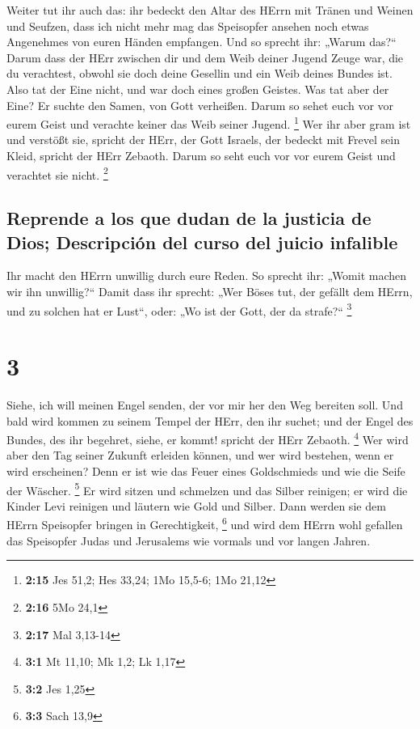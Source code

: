  Weiter tut ihr auch das: ihr bedeckt den Altar des HErrn
mit Tränen und Weinen und Seufzen, dass ich nicht mehr mag das
Speisopfer ansehen noch etwas Angenehmes von euren Händen empfangen.
 Und so sprecht ihr: „Warum das?{}`` Darum dass der HErr
zwischen dir und dem Weib deiner Jugend Zeuge war, die du verachtest,
obwohl sie doch deine Gesellin und ein Weib deines Bundes ist.
 Also tat der Eine nicht, und war doch eines großen
Geistes. Was tat aber der Eine? Er suchte den Samen, von Gott verheißen.
Darum so sehet euch vor vor eurem Geist und verachte keiner das Weib
seiner Jugend. \footnote{\textbf{2:15} Jes 51,2; Hes 33,24; 1Mo 15,5-6;
  1Mo 21,12}  Wer ihr aber gram ist und verstößt sie,
spricht der HErr, der Gott Israels, der bedeckt mit Frevel sein Kleid,
spricht der HErr Zebaoth. Darum so seht euch vor vor eurem Geist und
verachtet sie nicht. \footnote{\textbf{2:16} 5Mo 24,1}

\hypertarget{reprende-a-los-que-dudan-de-la-justicia-de-dios-descripciuxf3n-del-curso-del-juicio-infalible}{%
\subsection{Reprende a los que dudan de la justicia de Dios; Descripción
del curso del juicio
infalible}\label{reprende-a-los-que-dudan-de-la-justicia-de-dios-descripciuxf3n-del-curso-del-juicio-infalible}}

 Ihr macht den HErrn unwillig durch eure Reden. So
sprecht ihr: „Womit machen wir ihn unwillig?{}`` Damit dass ihr sprecht:
„Wer Böses tut, der gefällt dem HErrn, und zu solchen hat er Lust``,
oder: „Wo ist der Gott, der da strafe?{}`` \footnote{\textbf{2:17} Mal
  3,13-14}

\hypertarget{section-2}{%
\section{3}\label{section-2}}

 Siehe, ich will meinen Engel senden, der vor mir her den
Weg bereiten soll. Und bald wird kommen zu seinem Tempel der HErr, den
ihr suchet; und der Engel des Bundes, des ihr begehret, siehe, er kommt!
spricht der HErr Zebaoth. \footnote{\textbf{3:1} Mt 11,10; Mk 1,2; Lk
  1,17}  Wer wird aber den Tag seiner Zukunft erleiden
können, und wer wird bestehen, wenn er wird erscheinen? Denn er ist wie
das Feuer eines Goldschmieds und wie die Seife der Wäscher. \footnote{\textbf{3:2}
  Jes 1,25}  Er wird sitzen und schmelzen und das Silber
reinigen; er wird die Kinder Levi reinigen und läutern wie Gold und
Silber. Dann werden sie dem HErrn Speisopfer bringen in Gerechtigkeit,
\footnote{\textbf{3:3} Sach 13,9}  und wird dem HErrn wohl
gefallen das Speisopfer Judas und Jerusalems wie vormals und vor langen
Jahren.

